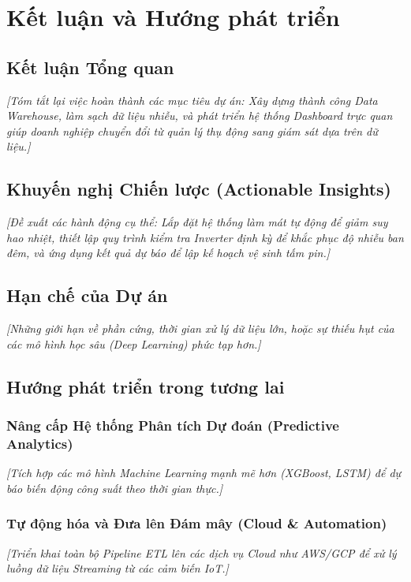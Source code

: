 \documentclass[12pt, a4paper]{report}
\begin{document}
\chapter{Kết luận và Hướng phát triển}
\label{chap:conclusion}

\section{Kết luận Tổng quan}
\label{sec:conclusion}
\textit{[Tóm tắt lại việc hoàn thành các mục tiêu dự án: Xây dựng thành công Data Warehouse, làm sạch dữ liệu nhiễu, và phát triển hệ thống Dashboard trực quan giúp doanh nghiệp chuyển đổi từ quản lý thụ động sang giám sát dựa trên dữ liệu.]}

\section{Khuyến nghị Chiến lược (Actionable Insights)}
\label{sec:recommendations}
\textit{[Đề xuất các hành động cụ thể: Lắp đặt hệ thống làm mát tự động để giảm suy hao nhiệt, thiết lập quy trình kiểm tra Inverter định kỳ để khắc phục độ nhiễu ban đêm, và ứng dụng kết quả dự báo để lập kế hoạch vệ sinh tấm pin.]}

\section{Hạn chế của Dự án}
\label{sec:limitations}
\textit{[Những giới hạn về phần cứng, thời gian xử lý dữ liệu lớn, hoặc sự thiếu hụt của các mô hình học sâu (Deep Learning) phức tạp hơn.]}

\section{Hướng phát triển trong tương lai}
\label{sec:future_work}
\subsection{Nâng cấp Hệ thống Phân tích Dự đoán (Predictive Analytics)}
\textit{[Tích hợp các mô hình Machine Learning mạnh mẽ hơn (XGBoost, LSTM) để dự báo biến động công suất theo thời gian thực.]}

\subsection{Tự động hóa và Đưa lên Đám mây (Cloud \& Automation)}
\textit{[Triển khai toàn bộ Pipeline ETL lên các dịch vụ Cloud như AWS/GCP để xử lý luồng dữ liệu Streaming từ các cảm biến IoT.]}
\end{document}

